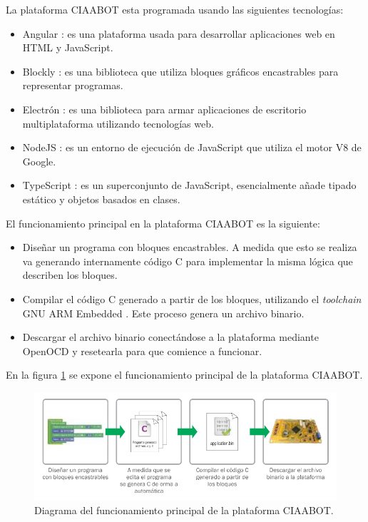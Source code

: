 La plataforma CIAABOT esta programada usando las siguientes tecnologías:

\begin{itemize}
	\item Angular \citep{angular}: es una plataforma usada para
	desarrollar aplicaciones web en HTML y JavaScript.
	\item Blockly \citep{blockly}: es una biblioteca que utiliza bloques gráficos encastrables para representar
    programas.
	\item Electrón \citep{electron}: es una biblioteca para armar aplicaciones de escritorio multiplataforma	utilizando tecnologías web.
	\item NodeJS \citep{nodejs}: es un entorno de ejecución de JavaScript que utiliza el motor V8 de Google.
	\item TypeScript \citep{typescript}: es un superconjunto de JavaScript, esencialmente añade tipado estático y objetos basados en clases.
\end{itemize}

El funcionamiento principal en la plataforma CIAABOT es la siguiente:

\begin{itemize}
	\item
	Diseñar un programa con bloques encastrables. A medida que esto se realiza va generando internamente código C para implementar la misma lógica que describen los bloques.
	\item
	Compilar el código C generado a partir de los bloques, utilizando el \emph{toolchain} GNU ARM Embedded \citep{Toolchain}. Este proceso genera un archivo binario.
	\item
	Descargar el archivo binario conectándose a la plataforma mediante OpenOCD \citep{openocd} y resetearla para que comience a funcionar.
\end{itemize}

En la figura \ref{fig:diagrama-ciaabot} se expone el funcionamiento principal de la plataforma CIAABOT.

\begin{figure}[!htbp]
	\begin{center}  %
		\includegraphics[width=14.5cm]{./Figures/CIAABOT_IDE_procesos01.pdf}
		\par\caption{Diagrama del funcionamiento principal de la plataforma CIAABOT.}\label{fig:diagrama-ciaabot}
	\end{center}
\end{figure}

